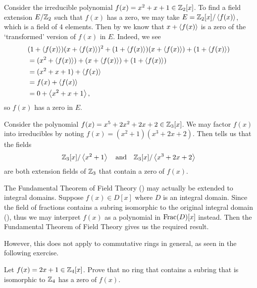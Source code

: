 \begin{example}
    Consider the irreducible polynomial $f(x) = x^2 + x + 1 \in \mathbb{Z}_2[x]$. To find a field extension $E/\mathbb{Z}_2$ such that $f(x)$ has a zero, we may take $E = \mathbb{Z}_2[x]/\left\langle f(x)\right\rangle$, which is a field of 4 elements. Then by  we know that $x + \left\langle f(x)\right\rangle$ is a zero of the `transformed' version of $f(x)$ in $E$. Indeed, we see
    \begin{align*}
        &(1 + \left\langle f(x)\right\rangle)(x + \left\langle f(x)\right\rangle)^2 + (1 + \left\langle f(x)\right\rangle)(x + \left\langle f(x)\right\rangle) + (1 + \left\langle f(x)\right\rangle)\\
        &= (x^2+\left\langle f(x)\right\rangle) + (x + \left\langle f(x)\right\rangle) + (1 + \left\langle f(x)\right\rangle)\\
        &= (x^2 + x + 1) + \left\langle f(x)\right\rangle\\
        &= f(x) + \left\langle f(x)\right\rangle\\
        &= 0 + \left\langle x^2+x+1\right\rangle,
    \end{align*}
    so $f(x)$ has a zero in $E$.
\end{example}

\begin{example}
    Consider the polynomial $f(x) = x^5 + 2x^2 + 2x + 2 \in \mathbb{Z}_3[x]$. We may factor $f(x)$ into irreducibles by noting $f(x) = (x^2+1)(x^3+2x+2)$. Then  tells us that the fields
    \[
        \mathbb{Z}_3[x]/\left\langle x^2+1\right\rangle \quad\text{and}\quad \mathbb{Z}_3[x]/\left\langle x^3+2x+2\right\rangle
    \]
    are both extension fields of $\mathbb{Z}_3$ that contain a zero of $f(x)$.
\end{example}

The Fundamental Theorem of Field Theory () may actually be extended to integral domains. Suppose $f(x) \in D[x]$ where $D$ is an integral domain. Since the field of fractions contains a subring isomorphic to the original integral domain (), thus we may interpret $f(x)$ as a polynomial in $\mathrm{Frac}(D)[x]$ instead. Then the Fundamental Theorem of Field Theory gives us the required result.

However, this does not apply to commutative rings in general, as seen in the following exercise.

\begin{exercise}
    Let $f(x) = 2x + 1 \in \mathbb{Z}_4[x]$. Prove that no ring that contains a subring that is isomorphic to $\mathbb{Z}_4$ has a zero of $f(x)$.
\end{exercise}

